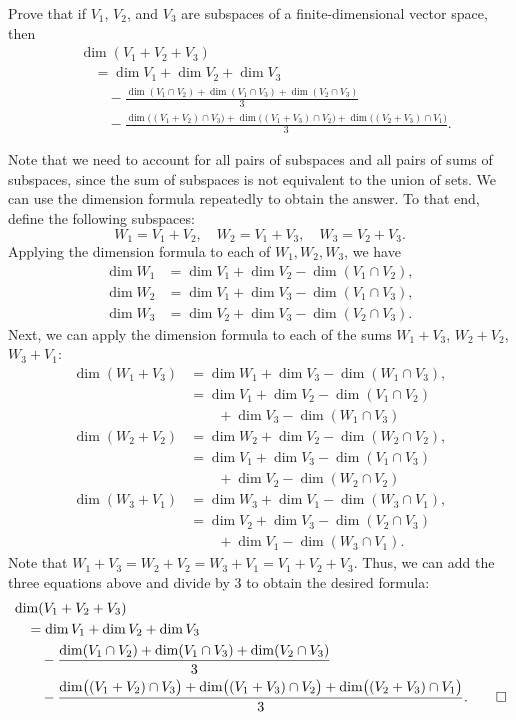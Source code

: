 \begin{exc}
\begin{exercise}
Prove that if $V_1$, $V_2$, and $V_3$ are subspaces of a finite-dimensional
vector space, then
\begin{align*}
&\dim(V_1+V_2+V_3)\\
&\quad= \dim V_1+\dim V_2+\dim V_3\\
&\qquad-\frac{\dim(V_1\cap V_2)+\dim(V_1\cap V_3)+\dim(V_2\cap V_3)}{3}\\
&\qquad-\frac{\dim\bigl((V_1+V_2)\cap V_3\bigr)+\dim\bigl((V_1+V_3)\cap V_2\bigr)
  +\dim\bigl((V_2+V_3)\cap V_1\bigr)}{3}.
\end{align*}
\end{exercise}
\begin{solution}
Note that we need to account for all pairs of subspaces and all pairs of sums of
subspaces, since the sum of subspaces is not equivalent to the union of sets. We
can use the dimension formula repeatedly to obtain the answer. To that end,
define the following subspaces:
\[ W_1=V_1+V_2, \quad W_2=V_1+V_3, \quad W_3=V_2+V_3. \]
Applying the dimension formula to each of $W_1,W_2,W_3$, we have
\begin{align*}
\dim W_1 &= \dim V_1+\dim V_2-\dim(V_1\cap V_2),\\
\dim W_2 &= \dim V_1+\dim V_3-\dim(V_1\cap V_3),\\
\dim W_3 &= \dim V_2+\dim V_3-\dim(V_2\cap V_3).
\end{align*}
Next, we can apply the dimension formula to each of the sums $W_1+V_3$,
$W_2+V_2$, $W_3+V_1$:
\begin{align*}
\dim(W_1+V_3) &= \dim W_1+\dim V_3-\dim(W_1\cap V_3),\\
  &= \dim V_1+\dim V_2-\dim(V_1\cap V_2)\\
  &\qquad+\dim V_3-\dim(W_1\cap V_3)\\
\dim(W_2+V_2) &= \dim W_2+\dim V_2-\dim(W_2\cap V_2),\\
  &= \dim V_1+\dim V_3-\dim(V_1\cap V_3)\\
  &\qquad+\dim V_2-\dim(W_2\cap V_2)\\
\dim(W_3+V_1) &= \dim W_3+\dim V_1-\dim(W_3\cap V_1),\\
  &= \dim V_2+\dim V_3-\dim(V_2\cap V_3)\\
  &\qquad+\dim V_1-\dim(W_3\cap V_1).
\end{align*}
Note that $W_1+V_3=W_2+V_2=W_3+V_1=V_1+V_2+V_3$. Thus, we can add the three
equations above and divide by $3$ to obtain the desired formula:
\begin{align*}
&\dim(V_1+V_2+V_3)\\
&\quad= \dim V_1+\dim V_2+\dim V_3\\
&\qquad-\frac{\dim(V_1\cap V_2)+\dim(V_1\cap V_3)+\dim(V_2\cap V_3)}{3}\\
&\qquad-\frac{\dim\bigl((V_1+V_2)\cap V_3\bigr)+\dim\bigl((V_1+V_3)\cap V_2\bigr)
  +\dim\bigl((V_2+V_3)\cap V_1\bigr)}{3}. \qedhere
\end{align*}
\end{solution}
\end{exc}

